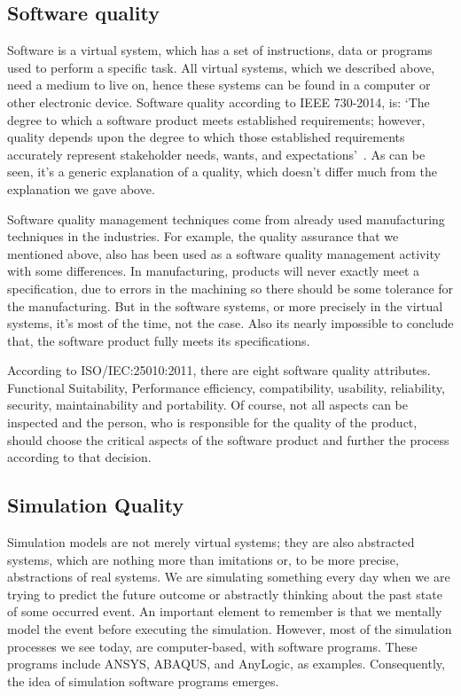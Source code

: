 \documentclass[9pt,conference]{IEEEtran}
\begin{document}
    \subsection*{Software quality}
    Software is a  virtual system, which has a set of instructions, data or programs used to perform a specific task. 
    All virtual systems, which we described above, need a medium to live on, hence these systems can be found in a computer or other electronic device.  
    Software quality according to IEEE 730-2014, is: 
    `The degree to which a software product meets established requirements; however, 
    quality depends upon the degree to which those established requirements accurately represent stakeholder needs, wants, and expectations'~\cite{IEE730-2014}. 
    As can be seen, it's a generic explanation of a quality, which doesn't differ much from the explanation we gave above. 

    Software quality management techniques come from already used manufacturing techniques in the industries.
    For example, the quality assurance that we mentioned above, also has been used as a software quality management activity with some differences. 
    In manufacturing, products will never exactly meet a specification, due to errors in the machining so there should be some tolerance for the manufacturing. 
    But in the software systems, or more precisely in the virtual systems, it's most of the time, not the case. 
    Also its nearly impossible to conclude that, the software product fully meets its specifications\cite{SoftwareEngineering}.

    According to ISO/IEC:25010:2011, there are eight software quality attributes. Functional Suitability, 
    Performance efficiency, compatibility, usability, reliability, security, maintainability and portability.\cite{ISO/IEC:25010}
    Of course, not all aspects can be inspected and the person, who is responsible for the quality of the product, should choose the critical aspects of the software product and further the process according to that decision.

    \subsection*{Simulation Quality}
    Simulation models are not merely virtual systems; they are also abstracted systems, which are nothing more than imitations or, to be more precise, abstractions of real systems. 
    We are simulating something every day when we are trying to predict the future outcome or abstractly thinking about the past state of some occurred event. 
    An important element to remember is that we mentally model the event before executing the simulation. However, most of the simulation processes we see today, 
    are computer-based, with software programs. These programs include ANSYS\cite{Ansys}, ABAQUS\cite{Abaqus}, and AnyLogic\cite{AnyLogic}, as examples. Consequently, the idea of simulation software programs emerges.
\end{document}
